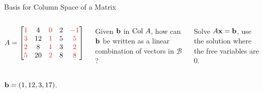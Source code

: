 \documentclass[xcolor=dvipsnames,aspectratio=169,t]{beamer}
\begin{document}
\begin{frame}{Basis for Column Space of a Matrix}
  \medskip
  
  \begin{columns}[T]
      $A=
      \begin{bmatrix}
      \red{1} & 4 & \red{0} & 2 & \red{-1}\\
      \red{3} & 12 & \red{1} & 5 & \red{5} \\
      \red{2} & 8 & \red{1} & 3 & \red{2} \\ 
      \red{5} & 20 & \red{2} & 8 & \red{8}
      \end{bmatrix}$
      \medskip
    
      Given $\mathbf{b}$ in $\mbox{Col } A$, how can $\mathbf{b}$ be written as a linear combination of vectors in $\mathcal{B}$?
      \medskip
      
      \pause
      Solve $A\mathbf{x}=\mathbf{b}$, use the solution where the free variables are $0$.
      \vspace*{1.5em}
      
  \end{columns}
  
    \pause
    $\mathbf{b}=(1,12,3,17)$.
    

\end{frame}
\end{document}
